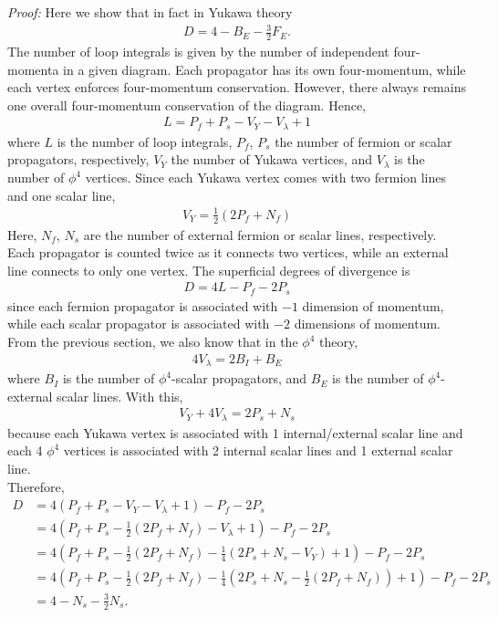 \documentclass{book}
\theoremstyle{definition}
\newcommand{\nn}{\nonumber}
\newcommand{\f}[2]{\frac{#1}{#2}}
\newcommand{\lp}{\left(}
\newcommand{\rp}{\right)}
\begin{document}
\textit{Proof:} Here we show that in fact in Yukawa theory
\begin{align}
D = 4 - B_E - \f{3}{2}F_E.
\end{align}  
The number of loop integrals is given by the number of independent four-momenta in a given diagram. Each propagator has its own four-momentum, while each vertex enforces four-momentum conservation. However, there always remains one overall four-momentum conservation of the diagram.
Hence,
\begin{align}
L = P_f + P_s - V_Y - V_\lambda + 1
\end{align}
where $L$ is the number of loop integrals, $P_f$, $P_s$ the number of fermion or scalar
propagators, respectively, $V_Y$ the number of Yukawa vertices, and $V_\lambda$ is the number of $\phi^4$ vertices. Since each
Yukawa vertex comes with two fermion lines and one scalar line,
\begin{align}
V_Y = \f{1}{2}(2P_f + N_f)
\end{align}
Here, $N_f$, $N_s$ are the number of external fermion or scalar lines, respectively. Each propagator is counted twice as it connects two vertices, while an external line connects to only one vertex. The superficial degrees of divergence is
\begin{align}
D = 4L - P_f - 2P_s
\end{align}
since each fermion propagator is associated with $-1$ dimension of momentum, while each scalar propagator is associated with $-2$ dimensions of momentum.\\

From the previous section, we also know that in the $\phi^4$ theory, 
\begin{align}
4V_\lambda = 2B_I + B_E 
\end{align}
where $B_I$ is the number of $\phi^4$-scalar propagators, and $B_E$ is the number of $\phi^4$-external scalar lines. With this, 
\begin{align}
V_Y + 4 V_\lambda = 2P_s + N_s
\end{align}
because each Yukawa vertex is associated with 1 internal/external scalar line and each 4 $\phi^4$ vertices is associated with 2 internal scalar lines and 1 external scalar line.\\

Therefore, 
\begin{align}
D &= 4(P_f + P_s - V_Y - V_\lambda + 1) - P_f - 2P_s \nn\\
&= 4\lp P_f + P_s - \f{1}{2}(2P_f + N_f) - V_\lambda + 1\rp - P_f - 2P_s \nn\\
&= 4\lp P_f + P_s - \f{1}{2}(2P_f + N_f) - \f{1}{4}\lp 2P_s + N_s - V_Y   \rp + 1\rp - P_f - 2P_s \nn\\
&= 4\lp P_f + P_s - \f{1}{2}(2P_f + N_f) - \f{1}{4}\lp 2P_s + N_s - \f{1}{2}(2P_f + N_f)  \rp + 1\rp - P_f - 2P_s\nn\\
&= 4 - N_s - \f{3}{2}N_s.
\end{align}
\end{document}
